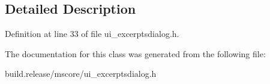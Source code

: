 \subsection{Detailed Description}


Definition at line 33 of file ui\+\_\+excerptsdialog.\+h.



The documentation for this class was generated from the following file\+:\begin{DoxyCompactItemize}
\item 
build.\+release/mscore/ui\+\_\+excerptsdialog.\+h\end{DoxyCompactItemize}

